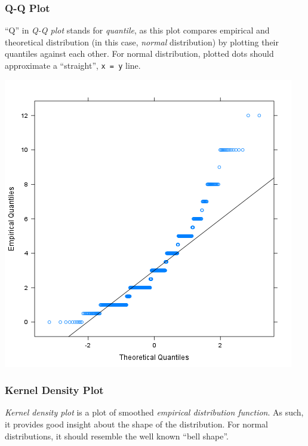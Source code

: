 \documentclass[]{article}
\makeatletter
\def\maxwidth{\ifdim\Gin@nat@width>\linewidth\linewidth
\else\Gin@nat@width\fi}
\let\Oldincludegraphics\includegraphics
\renewcommand{\includegraphics}[1]{\Oldincludegraphics[width=\maxwidth]{#1}}
\makeatother
\begin{document}
\subsubsection{Q-Q Plot}

``Q'' in \emph{Q-Q plot} stands for \emph{quantile}, as this plot
compares empirical and theoretical distribution (in this case,
\emph{normal} distribution) by plotting their quantiles against each
other. For normal distribution, plotted dots should approximate a
``straight'', \texttt{x = y} line.

\href{eecb9a780afd4dd0de9737991e467a6e-hires.png}{\includegraphics{eecb9a780afd4dd0de9737991e467a6e.png}}

\subsubsection{Kernel Density Plot}

\emph{Kernel density plot} is a plot of smoothed \emph{empirical
distribution function}. As such, it provides good insight about the
shape of the distribution. For normal distributions, it should resemble
the well known ``bell shape''.
\end{document}
